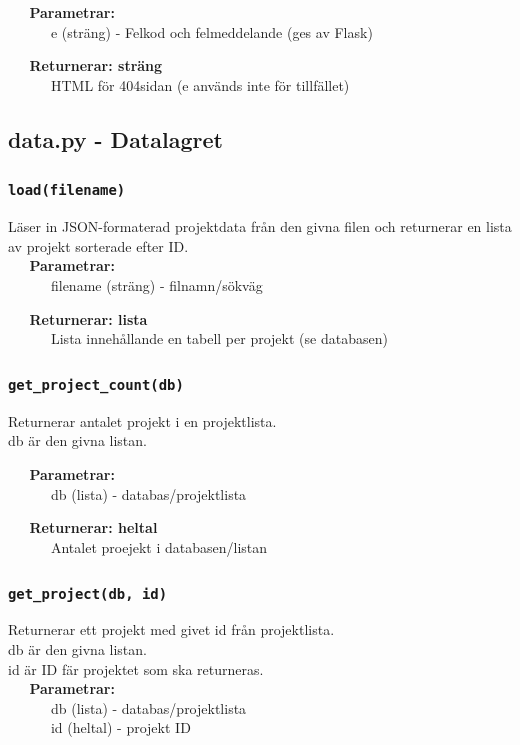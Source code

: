 \documentclass{TDP003mall}
\begin{document}
\verb|   |\textbf{Parametrar:}\\
\verb|   |\verb|   |e (sträng) - Felkod och felmeddelande (ges av Flask)

\verb|   |\textbf{Returnerar: sträng}\\
\verb|   |\verb|   |HTML för 404sidan (e används inte för tillfället)


\subsection{data.py - Datalagret}
\subsubsection{\texttt{load(filename)}}
Läser in JSON-formaterad projektdata från den givna filen och returnerar en lista av projekt sorterade efter ID.\\

  \verb|   |\textbf{Parametrar:}\\
  \verb|   |\verb|   |filename (sträng) - filnamn/sökväg

  \verb|   |\textbf{Returnerar: lista}\\
  \verb|   |\verb|   |Lista innehållande en tabell per projekt (se databasen)

\subsubsection{\texttt{get\_project\_count(db)}}
Returnerar antalet projekt i en projektlista.\\
db är den givna listan.

  \verb|   |\textbf{Parametrar:}\\
  \verb|   |\verb|   |db (lista) - databas/projektlista

  \verb|   |\textbf{Returnerar: heltal}\\
  \verb|   |\verb|   |Antalet proejekt i databasen/listan

\subsubsection{\texttt{get\_project(db, id)}}
Returnerar ett projekt med givet id från projektlista.\\
db är den givna listan.\\
id är ID fär projektet som ska returneras.\\

\verb|   |\textbf{Parametrar:}\\
\verb|   |\verb|   |db (lista) - databas/projektlista\\
\verb|   |\verb|   |id (heltal) - projekt ID
\end{document}
